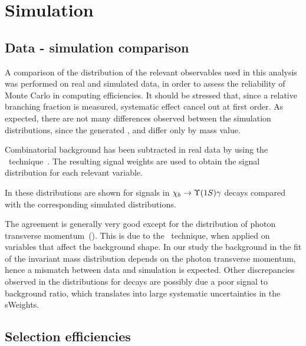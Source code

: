 
\section{Simulation}
\label{sec:mc}

\subsection{Data - simulation comparison}
\label{sec:mc:datavsmc}

A comparison of the distribution of the relevant observables used in this
analysis was performed on real and simulated data, in order to assess the
reliability of Monte Carlo in computing efficiencies. It should be stressed
that, since a relative branching fraction is measured, systematic effect cancel
out at first order. As expected, there are not many differences observed between
the simulation distributions, since the generated \chibOneP, \chibTwoP and
\chibThreeP differ only by \chib mass value.

Combinatorial background has been subtracted in real data by using 
the \sPlot\  technique~\cite{Pivk:2004ty}.
The resulting signal weights are used to obtain the signal distribution for each
relevant variable. 


In 
these distributions  are shown for signals in $\chib \to \Y1S \gamma$ decays
compared with the corresponding simulated distributions.




The agreement is generally very good except for the distribution of photon
transverse momentum~(). This is due to the \sPlot\ 
technique, when applied on variables that affect the background shape. In our
study the background in the fit of the invariant mass distribution 
depends on the photon transverse momentum,
hence a mismatch between data and simulation is expected. Other discrepancies
observed in the distributions for \chibThreeP decays are possibly due a poor
signal to background ratio, which translates into large systematic
uncertainties in the sWeights. 


\subsection{Selection efficiencies}
\label{sec:mc:eff}

